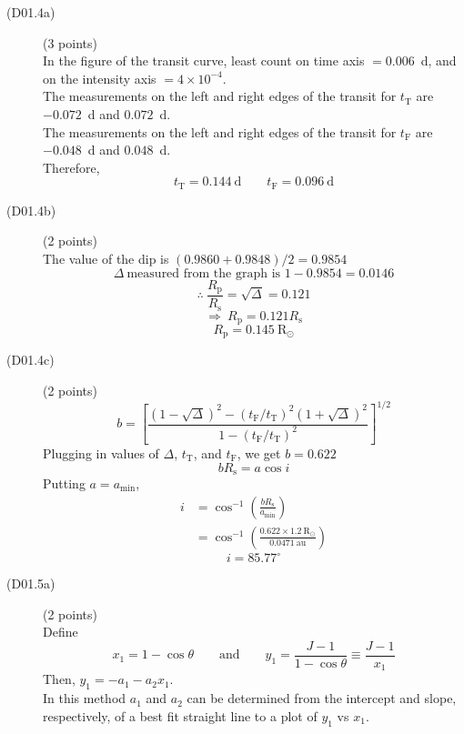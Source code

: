 \begin{description}
\item[(D01.4a)] \hfill(3 points)\\
In the figure of the transit curve, least count on time axis $= 0.006$~d, and
on the intensity axis $= 4\times10^{-4}$.\\
The measurements on the left and right edges of the transit for
$t_{\mathrm{T}}$ are $-0.072$~d and $0.072$~d.\\
The measurements on the left and right edges of the transit for
$t_{\mathrm{F}}$ are $-0.048$~d and $0.048$~d.\\
Therefore,
\[ \boxed{t_{\mathrm{T}} = 0.144\ \mathrm{d}} \qquad
   \boxed{t_{\mathrm{F}} = 0.096\ \mathrm{d}} \]

\item[(D01.4b)] \hfill(2 points)\\
The value of the dip is $(0.9860+0.9848)/2 = 0.9854$
\[ \Delta\ \text{measured from the graph is } 1-0.9854 = 0.0146 \]
\[ \therefore\ \frac{R_{\mathrm{p}}}{R_{\mathrm{s}}} = \sqrt{\Delta} = 0.121 \]
\[ \Longrightarrow\ R_{\mathrm{p}} = 0.121 R_{\mathrm{s}} \]
\[ \boxed{R_{\mathrm{p}} = 0.145\ \mathrm{R_\odot}} \]

\item[(D01.4c)] \hfill(2 points)
\[ b = \left[\frac{(1-\sqrt{\Delta})^2
   - (t_{\mathrm{F}}/t_{\mathrm{T}})^2(1+\sqrt{\Delta})^2}
   {1-(t_{\mathrm{F}}/t_{\mathrm{T}})^2}\right]^{1/2} \]
Plugging in values of $\Delta$, $t_{\mathrm{T}}$, and $t_{\mathrm{F}}$, we get
$b = 0.622$
\[ bR_{\mathrm{s}} = a\cos i \]
Putting $a = a_{\min}$,
\begin{align*}
i &= \cos^{-1}\!\left(\frac{bR_{\mathrm{s}}}{a_{\min}}\right)\\
  &= \cos^{-1}\!\left(\frac{0.622\times1.2\ \mathrm{R_\odot}}{0.0471\ \mathrm{au}}\right)
\end{align*}
\[ \boxed{i = 85.77^\circ} \]

\item[(D01.5a)] \hfill(2 points)\\
Define
\[ \boxed{x_1 = 1-\cos\theta} \qquad\text{and}\qquad
   \boxed{y_1 = \frac{J-1}{1-\cos\theta} \equiv \frac{J-1}{x_1}} \]
Then, $y_1 = -a_1 - a_2 x_1$.\\
In this method $a_1$ and $a_2$ can be determined from the intercept and
slope, respectively, of a best fit straight line to a plot of $y_1$ vs $x_1$.


\end{description}
